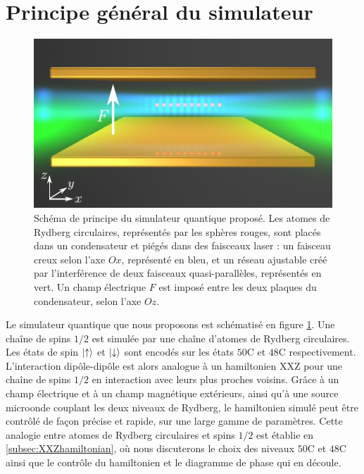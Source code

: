 \section{Principe général du simulateur}
%
\begin{figure}[t]
\centering
\includegraphics[width=.8\linewidth]{figures/circsim/scheme_simulator}
\caption[Schéma de principe du simulateur quantique]
{Schéma de principe du simulateur quantique proposé.
Les atomes de Rydberg circulaires, représentés par les sphères rouges, sont placés dans un condensateur et piégés dans des faisceaux laser : un faisceau \og creux \fg{} selon l'axe $Ox$, représenté en bleu, et un réseau ajustable créé par l'interférence de deux faisceaux quasi-parallèles, représentés en vert.
Un champ électrique $F$ est imposé entre les deux plaques du condensateur, selon l'axe $Oz$.
}
\label{fig:scheme_simul}
\end{figure}
%
\noindent Le simulateur quantique que nous proposons est schématisé en figure \ref{fig:scheme_simul}.
Une chaîne de spins $1/2$ est simulée par une chaîne d'atomes de Rydberg circulaires.
Les états de spin $\ket{\uparrow}$ et $\ket{\downarrow}$ sont encodés sur les états $\mathrm{50C}$ et $\mathrm{48C}$ respectivement.
L'interaction dipôle-dipôle est alors analogue à un hamiltonien XXZ pour une chaîne de spins $1/2$ en interaction avec leurs plus proches voisins.
Grâce à un champ électrique et à un champ magnétique extérieurs, ainsi qu'à une source microonde couplant les deux niveaux de Rydberg, le hamiltonien simulé peut être contrôlé de façon précise et rapide, sur une large gamme de paramètres.
Cette analogie entre atomes de Rydberg circulaires et spins $1/2$ est établie en \ref{subsec:XXZhamiltonian}, où nous discuterons le choix des niveaux $\mathrm{50C}$ et $\mathrm{48C}$ ainsi que le contrôle du hamiltonien et le diagramme de phase qui en découle.

